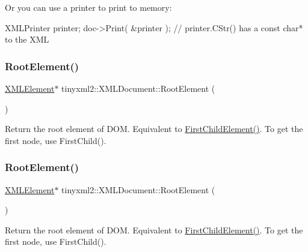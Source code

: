 Or you can use a printer to print to memory\+: \begin{DoxyVerb}XMLPrinter printer;
doc->Print( &printer );
// printer.CStr() has a const char* to the XML
\end{DoxyVerb}
 \mbox{\label{classtinyxml2_1_1XMLDocument_ad2b70320d3c2a071c2f36928edff3e1c}} 
\subsubsection{\texorpdfstring{Root\+Element()}{RootElement()}\hspace{0.1cm}{\footnotesize\ttfamily [1/2]}}
{\footnotesize\ttfamily \hyperlink{classtinyxml2_1_1XMLElement}{X\+M\+L\+Element}$\ast$ tinyxml2\+::\+X\+M\+L\+Document\+::\+Root\+Element (\begin{DoxyParamCaption}{ }\end{DoxyParamCaption})\hspace{0.3cm}{\ttfamily [inline]}}

Return the root element of D\+OM. Equivalent to \hyperlink{classtinyxml2_1_1XMLNode_a4f9c37890cc8130313af2deabc7389cb}{First\+Child\+Element()}. To get the first node, use First\+Child(). \mbox{\label{classtinyxml2_1_1XMLDocument_ad2b70320d3c2a071c2f36928edff3e1c}} 
\subsubsection{\texorpdfstring{Root\+Element()}{RootElement()}\hspace{0.1cm}{\footnotesize\ttfamily [2/2]}}
{\footnotesize\ttfamily \hyperlink{classtinyxml2_1_1XMLElement}{X\+M\+L\+Element}$\ast$ tinyxml2\+::\+X\+M\+L\+Document\+::\+Root\+Element (\begin{DoxyParamCaption}{ }\end{DoxyParamCaption})\hspace{0.3cm}{\ttfamily [inline]}}

Return the root element of D\+OM. Equivalent to \hyperlink{classtinyxml2_1_1XMLNode_a4f9c37890cc8130313af2deabc7389cb}{First\+Child\+Element()}. To get the first node, use First\+Child(). \mbox{\label{classtinyxml2_1_1XMLDocument_a73ac416b4a2aa0952e841220eb3da18f}} 
